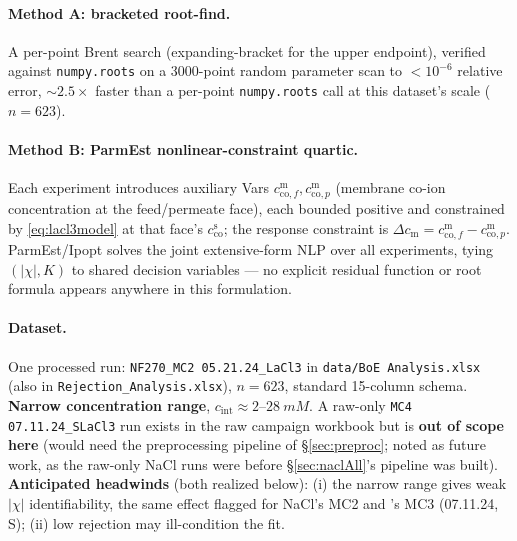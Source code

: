 \documentclass[11pt]{article}
\newcommand{\cm}[1]{{c^{\mathrm{m}}_{#1}}}
\newcommand{\cs}[1]{{c^{\mathrm{s}}_{#1}}}
\newcommand{\co}{\mathrm{co}}
\newcommand{\cint}{c_{\mathrm{int}}}
\begin{document}
\paragraph{Method A: bracketed root-find.} A per-point Brent search
(expanding-bracket for the upper endpoint), verified against
\texttt{numpy.roots} on a 3000-point random parameter scan to $<10^{-6}$
relative error, $\sim\!2.5\times$ faster than a per-point \texttt{numpy.roots}
call at this dataset's scale ($n=623$).

\paragraph{Method B: ParmEst nonlinear-constraint quartic.} Each experiment
introduces auxiliary Vars $\cm{\co,f},\cm{\co,p}$ (membrane co-ion
concentration at the feed/permeate face), each bounded positive and
constrained by \eqref{eq:lacl3model} at that face's $\cs{\co}$; the response
constraint is $\Delta c_{\mathrm m}=\cm{\co,f}-\cm{\co,p}$. ParmEst/Ipopt
solves the joint extensive-form NLP over all experiments, tying $(|\chi|,K)$
to shared decision variables --- no explicit residual function or root
formula appears anywhere in this formulation.

\paragraph{Dataset.} One processed  run: \texttt{NF270\_MC2
05.21.24\_LaCl3} in \texttt{data/BoE Analysis.xlsx} (also in
\texttt{Rejection\_Analysis.xlsx}), $n=623$, standard 15-column schema.
\textbf{Narrow concentration range}, $\cint\approx2$--$\SI{28}{mM}$. A
raw-only \texttt{MC4 07.11.24\_SLaCl3} run exists in the raw campaign
workbook but is \textbf{out of scope here} (would need the preprocessing
pipeline of \S\ref{sec:preproc}; noted as future work, as the raw-only NaCl
runs were before \S\ref{sec:naclAll}'s pipeline was built).
\textbf{Anticipated headwinds} (both realized below): (i) the narrow range
gives weak $|\chi|$ identifiability, the same effect flagged for NaCl's MC2
and 's MC3 (07.11.24, S); (ii) low  rejection may
ill-condition the fit.
\end{document}
